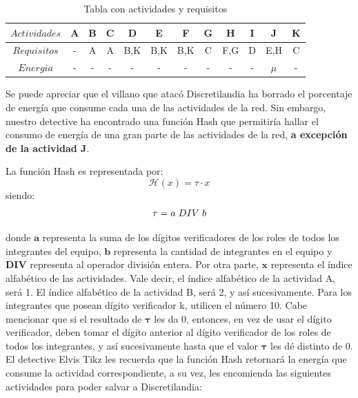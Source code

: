 \documentclass[letterpaper,10pt]{article}
\begin{document}
\begin{enumerate}
    \begin{table}[H]
    \centering
\begin{tabular}{|c|c|c|c|c|c|c|c|c|c|c|c|}\hline
    $Actividades$ & A & B & C & D & E & F & G & H & I & J & K \\ \hline
     $Requisitos$ & - & A & A & B,K & B,K & B,K & C & F,G & D & E,H & C   \\\hline
     $Energia$ & - & - & - & - & - & - & - & - & - & $\mu $ & - \\\hline
    \end{tabular}
    \caption{Tabla con actividades y requisitos}
    \label{act}
\end{table}
    

Se puede apreciar que el villano que atacó  Discretilandia ha borrado el porcentaje de energía que consume cada una de las actividades de la red. Sin embargo, nuestro detective ha encontrado una función Hash que permitiría hallar el consumo de energía de una gran parte de las actividades de la red, \textbf{a excepción de la actividad J}.



La función Hash es representada por: 
\begin{equation}
\mathcal{H}(x) = \tau \cdot x 
\end{equation}
siendo:
\begin{equation}
\tau = a \hspace{0.1cm} DIV \hspace{0.1cm} b
\end{equation}

donde $\boldsymbol{a}$ representa la suma de los dígitos verificadores de los roles de todos los integrantes del equipo, $\boldsymbol{b}$ representa la cantidad de integrantes en el equipo y $\boldsymbol{DIV}$ representa al operador división entera. Por otra parte, $\boldsymbol{x}$ representa el índice alfabético de las actividades. Vale decir, el índice alfabético de la actividad A, será 1. El índice alfabético de la actividad B, será 2, y así sucesivamente. Para los integrantes que posean dígito verificador k, utilicen el número 10.  Cabe mencionar que si el resultado de $\boldsymbol{\tau}$ les da 0, entonces, en vez de usar el dígito verificador, deben tomar el dígito anterior al dígito verificador de los roles de todos los integrantes, y así sucesivamente hasta que el valor $\boldsymbol{\tau}$ les dé distinto de 0. El detective Elvis Tikz les recuerda que la función Hash retornará la energía que consume la actividad
correspondiente, a su vez, les encomienda las siguientes actividades para poder salvar a Discretilandia:\\


\end{enumerate}
\end{document}
